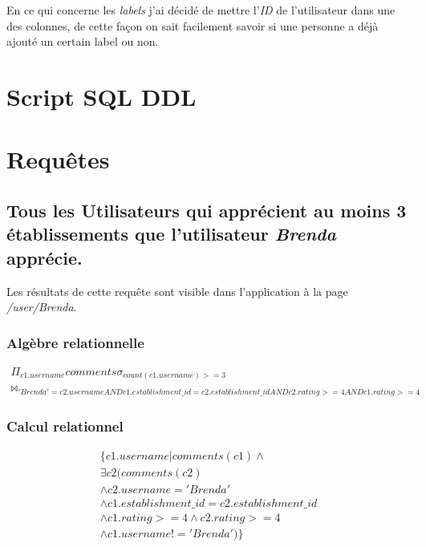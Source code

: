 \documentclass[a4paper,10pt]{article}
\begin{document}
En ce qui concerne les \emph{labels} j'ai décidé de mettre l'\emph{ID} de
l'utilisateur dans une des colonnes, de cette façon on sait facilement savoir
si une personne a déjà ajouté un certain label ou non.

\section{Script SQL DDL}
    

    \pagebreak

\section{Requêtes}
\subsection{Tous les Utilisateurs qui apprécient au moins 3 établissements que
l'utilisateur \emph{Brenda} apprécie.}
    Les résultats de cette requête sont visible dans l'application à la page
    \emph{/user/Brenda}.
    
\subsubsection{Algèbre relationnelle}
\begin{align}
    \Pi_{c1.username}comments \sigma_{count(c1.username)>=3}
    \\\bowtie_{'Brenda'=c2.username AND
    c1.establishment\_id=c2.establishment\_id AND c2.rating>=4 AND
    c1.rating>=4}
\end{align}

\subsubsection{Calcul relationnel}
\begin{align}
    \{ c1.username | comments(c1) \wedge \\
    \exists c2 ( comments(c2) \\
        \wedge c2.username='Brenda' \\
        \wedge c1.establishment\_id=c2.establishment\_id \\
        \wedge c1.rating>=4 \wedge c2.rating>=4 \\
        \wedge c1.username!='Brenda') \}
\end{align}

\end{document}
